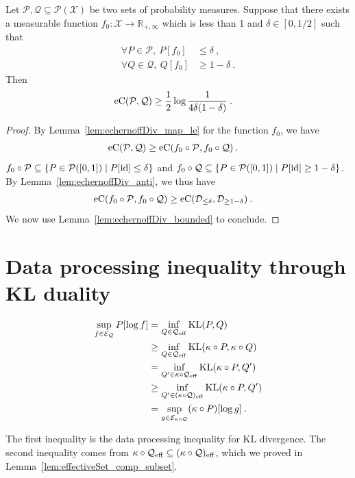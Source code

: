 \begin{theorem}\label{thm:echernoffDiv_lower_bound}
  \leanok
Let $\mathcal{P},\mathcal{Q} \subseteq \mathcal{P}(\mathcal{X})$ be two sets of probability measures.
Suppose that there exists a measurable function $f_0 : \mathcal{X} \to \mathbb{R}_{+,\infty}$ which is less than 1 and $\delta \in [0,1/2]$ such that
\begin{align*}
  \forall P \in \mathcal{P}, \: P[f_0] &\le \delta
  \: , \\
  \forall Q \in \mathcal{Q}, \: Q[f_0] &\ge 1 - \delta
  \: .
\end{align*}
Then
\begin{align*}
  \operatorname{eC}(\mathcal{P}, \mathcal{Q})
  &\ge \frac{1}{2} \log \frac{1}{4\delta(1 - \delta)}
  \: .
\end{align*}
\end{theorem}

\begin{proof}\leanok
By Lemma~\ref{lem:echernoffDiv_map_le} for the function $f_0$, we have
\begin{align*}
  \operatorname{eC}(\mathcal{P}, \mathcal{Q})
  &\ge \operatorname{eC}(f_0 \circ \mathcal{P}, f_0 \circ \mathcal{Q})
  \: .
\end{align*}
$f_0 \circ \mathcal{P} \subseteq \{P \in \mathcal{P}([0,1]) \mid P[\operatorname{id}] \le \delta\}$ and $f_0 \circ \mathcal{Q} \subseteq \{P \in \mathcal{P}([0,1]) \mid P[\operatorname{id}] \ge 1 - \delta\}$.
By Lemma~\ref{lem:echernoffDiv_anti}, we thus have
\begin{align*}
  \operatorname{eC}(f_0 \circ \mathcal{P}, f_0 \circ \mathcal{Q})
  &\ge \operatorname{eC}(\mathcal{D}_{\le \delta}, \mathcal{D}_{\ge 1 - \delta})
  \: .
\end{align*}
We now use Lemma~\ref{lem:echernoffDiv_bounded} to conclude.
\end{proof}


\section{Data processing inequality through KL duality}

\begin{align*}
  \sup_{f \in \mathcal{E}_{\mathcal{Q}}} P[\log f]
  &= \inf_{Q \in \mathcal{Q}_{\operatorname{eff}}} \operatorname{KL}(P, Q)
  \\
  &\ge \inf_{Q \in \mathcal{Q}_{\operatorname{eff}}} \operatorname{KL}(\kappa \circ P, \kappa \circ Q)
  \\
  &= \inf_{Q' \in \kappa \circ \mathcal{Q}_{\operatorname{eff}}} \operatorname{KL}(\kappa \circ P, Q')
  \\
  &\ge \inf_{Q' \in (\kappa \circ \mathcal{Q})_{\operatorname{eff}}} \operatorname{KL}(\kappa \circ P, Q')
  \\
  &= \sup_{g \in \mathcal{E}_{\kappa \circ \mathcal{Q}}} (\kappa \circ P)[\log g]
  \: .
\end{align*}

The first inequality is the data processing inequality for KL divergence.
The second inequality comes from $\kappa \circ \mathcal{Q}_{\operatorname{eff}} \subseteq (\kappa \circ \mathcal{Q})_{\operatorname{eff}}$, which we proved in Lemma~\ref{lem:effectiveSet_comp_subset}.
